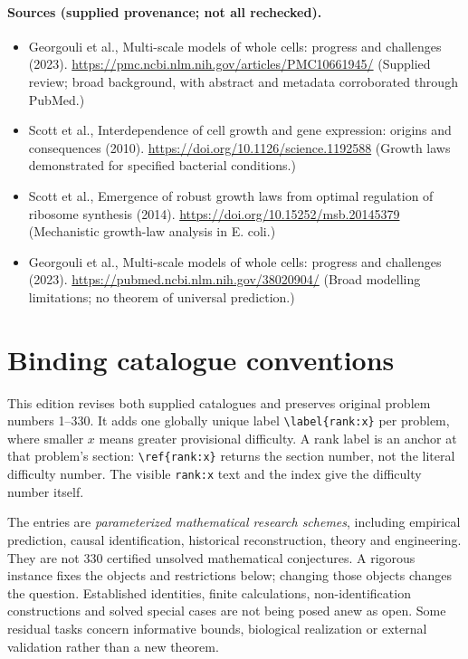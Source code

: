 \documentclass[11pt]{article}
\begin{document}
\paragraph{Sources (supplied provenance; not all rechecked).}
\begin{itemize}
\item Georgouli et al., Multi-scale models of whole cells: progress and challenges (2023). \url{https://pmc.ncbi.nlm.nih.gov/articles/PMC10661945/} (Supplied review; broad background, with abstract and metadata corroborated through PubMed.)
\item Scott et al., Interdependence of cell growth and gene expression: origins and consequences (2010). \url{https://doi.org/10.1126/science.1192588} (Growth laws demonstrated for specified bacterial conditions.)
\item Scott et al., Emergence of robust growth laws from optimal regulation of ribosome synthesis (2014). \url{https://doi.org/10.15252/msb.20145379} (Mechanistic growth-law analysis in E. coli.)
\item Georgouli et al., Multi-scale models of whole cells: progress and challenges (2023). \url{https://pubmed.ncbi.nlm.nih.gov/38020904/} (Broad modelling limitations; no theorem of universal prediction.)
\end{itemize}


\section*{Binding catalogue conventions}
This edition revises both supplied catalogues and preserves original problem numbers 1--330. It adds one globally unique label \verb|\label{rank:x}| per problem, where smaller $x$ means greater provisional difficulty. A rank label is an anchor at that problem's section: \verb|\ref{rank:x}| returns the section number, not the literal difficulty number. The visible \texttt{rank:x} text and the index give the difficulty number itself.

The entries are \emph{parameterized mathematical research schemes}, including empirical prediction, causal identification, historical reconstruction, theory and engineering. They are not 330 certified unsolved mathematical conjectures. A rigorous instance fixes the objects and restrictions below; changing those objects changes the question. Established identities, finite calculations, non-identification constructions and solved special cases are not being posed anew as open. Some residual tasks concern informative bounds, biological realization or external validation rather than a new theorem.
\end{document}
